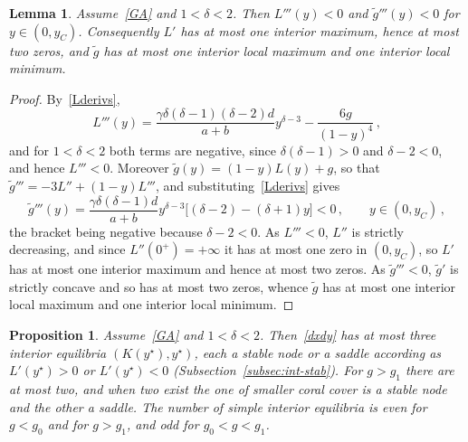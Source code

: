 \documentclass[reqno,11pt]{amsart}
\newtheorem{lem}[thm]{Lemma}
\newtheorem{prop}[thm]{Proposition}
\numberwithin{equation}{section}
\begin{document}
\begin{lem}\label{lem:shape-nonconcave}
Assume~\eqref{GA} and $1<\delta<2$. Then $L'''(y)<0$ and $\tilde g'''(y)<0$ for $y\in(0,y_C)$. Consequently $L'$ has at most one interior maximum, hence at most two zeros, and $\tilde g$ has at most one interior local maximum and one interior local minimum.
\end{lem}

\begin{proof}
By~\eqref{Lderivs},
\[
L'''(y)=\frac{\gamma\delta(\delta-1)(\delta-2)d}{a+b}y^{\delta-3}-\frac{6g}{(1-y)^4}\,,
\]
and for $1<\delta<2$ both terms are negative, since $\delta(\delta-1)>0$ and $\delta-2<0$, and hence $L'''<0$. Moreover $\tilde g(y)=(1-y)L(y)+g$, so that $\tilde g'''=-3L''+(1-y)L'''$, and substituting~\eqref{Lderivs} gives
\[
\tilde g'''(y)=\frac{\gamma\delta(\delta-1)d}{a+b}y^{\delta-3}\big[(\delta-2)-(\delta+1)y\big]<0\,,\qquad y\in(0,y_C)\,,
\]
the bracket being negative because $\delta-2<0$. As $L'''<0$, $L''$ is strictly decreasing, and since $L''(0^+)=+\infty$ it has at most one zero in $(0,y_C)$, so $L'$ has at most one interior maximum and hence at most two zeros. As $\tilde g'''<0$, $\tilde g'$ is strictly concave and so has at most two zeros, whence $\tilde g$ has at most one interior local maximum and one interior local minimum.
\end{proof}

\begin{prop}\label{prop:nonconcave}
Assume~\eqref{GA} and $1<\delta<2$. Then~\eqref{dxdy} has at most three interior equilibria $(K(y^\star),y^\star)$, each a stable node or a saddle according as $L'(y^\star)>0$ or $L'(y^\star)<0$ (Subsection~\ref{subsec:int-stab}). For $g>g_1$ there are at most two, and when two exist the one of smaller coral cover is a stable node and the other a saddle. The number of simple interior equilibria is even for $g<g_0$ and for $g>g_1$, and odd for $g_0<g<g_1$.
\end{prop}
\end{document}
